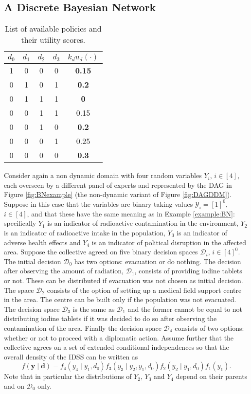 \subsection{A Discrete Bayesian Network}

\begin{table}
\begin{center}
\begin{tabular}{|c|c|c|c|c|}
\hline
$d_0$&$d_1$&$d_2$&$d_3$&$k_du_d(\cdot)$\\
\hline\hline
1&0&0&0&\textbf{0.15}\\
0&1&0&1&\textbf{0.2}\\
0&1&1&1&\textbf{0}\\
0&0&1&1&0.15\\
0&0&1&0&\textbf{0.2}\\
0&0&0&1&0.25\\
0&0&0&0&\textbf{0.3}\\
\hline
\end{tabular}
\end{center}
\caption{List of available policies and their utility scores. \label{table:ex1}}
\end{table}
Consider again a non dynamic domain with four random variables $Y_i$, $i\in[4]$, each overseen by a different panel of experts and represented by the DAG in Figure \ref{fig:BNexample} (the non-dynamic variant of Figure \ref{fig:DAGDDM}). Suppose in this case that the variables are binary taking values $\mathcal{Y}_i=[1]^0$, $i\in[4]$, and that these have the same meaning as in Example \ref{example:BN}: specifically $Y_1$ is an indicator of radioactive contamination in the environment, $Y_2$ is an indicator of radioactive intake in the population, $Y_3$ is an indicator of adverse health effects and $Y_4 $ is an indicator of political disruption in the affected area. Suppose the collective agreed on five binary decision spaces $\mathcal{D}_i$, $i\in[4]^0$. The initial decision $\mathcal{D}_0$ has two options: evacuation or do nothing. The decision after observing the amount of radiation, $\mathcal{D}_1$, consists of providing iodine tablets or not. These can be distributed if evacuation was not chosen as initial decision. The space $\mathcal{D}_2$ consists of the option of setting up a medical field support centre in the area. The centre can be built only if the population was not evacuated. The decision space $\mathcal{D}_3$ is the same as $\mathcal{D}_1$ and the former cannot be equal to not distributing iodine tablets if it was decided to do
so after observing the contamination of the area. Finally the decision space $\mathcal{D}_4$ consists of two options: whether or not to proceed with a diplomatic action. Assume further that the collective agrees on a set of extended conditional independences so that the overall density of the IDSS can be written as 
\begin{equation*}
f(\bm{y}\;|\;\bm{d})=f_4(y_4\;|\;y_1,d_0)f_3(y_3\;|\;y_2,y_1,d_0)f_2(y_2\;|\;y_1,d_0)f_1(y_1).
\end{equation*}
Note that in particular the distributions of $Y_2$, $Y_3$ and $Y_4$ depend on their parents and on $\mathcal{D}_0$ only.

